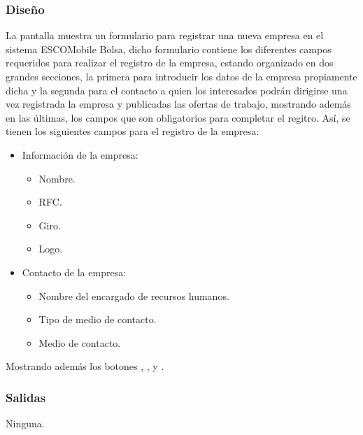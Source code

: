 \subsubsection{Diseño}
	\noindent
	La pantalla muestra un formulario para registrar una nueva empresa en el sistema ESCOMobile Bolsa, dicho formulario contiene los diferentes campos requeridos para realizar el registro de la empresa, estando organizado en dos grandes secciones, la primera para introducir los datos de la empresa propiamente dicha y la segunda para el contacto a quien los interesados podrán dirigirse una vez registrada la empresa y publicadas las ofertas de trabajo, mostrando además en las últimas, los campos que son obligatorios para completar el regitro. Así, se tienen los siguientes campos para el registro de la empresa:
	\begin{itemize}
		\item Información de la empresa:
		\begin{itemize}
			\item Nombre.
			\item RFC.
			\item Giro.
			\item Logo.
		\end{itemize}
		\item Contacto de la empresa:
		\begin{itemize}
			\item Nombre del encargado de recursos humanos.
			\item Tipo de medio de contacto. 
			\item Medio de contacto. 
		\end{itemize}
	\end{itemize}
	Mostrando además los botones , \IUbutton{+},  y .

\pagebreak
{}

\subsubsection{Salidas}
	\noindent
	Ninguna.

